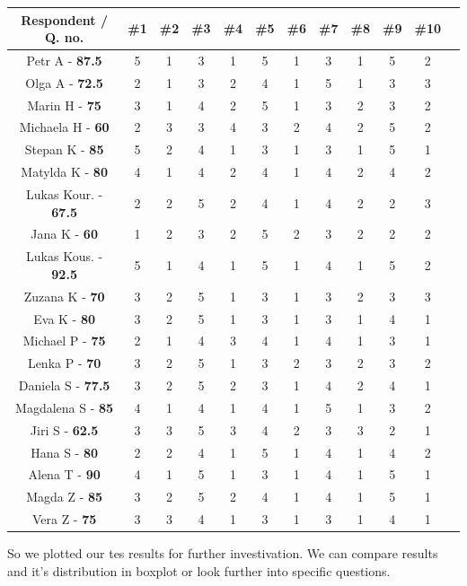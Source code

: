 \begin{tabular}{ |c|c|c|c|c|c|c|c|c|c|c|c| } 
    \hline
    Respondent / Q. no. & \#1 & \#2& \#3& \#4& \#5& \#6& \#7& \#8& \#9& \#10 \\
    \hline
    Petr A - \textbf{87.5}     & 5 & 1& 3& 1& 5& 1& 3& 1& 5& 2 \\ 
    Olga A - \textbf{72.5}     & 2 & 1& 3& 2& 4& 1& 5& 1& 3& 3 \\ 
    Marin H - \textbf{75}    & 3 & 1& 4& 2& 5& 1& 3& 2& 3& 2 \\ 
    Michaela H - \textbf{60} & 2 & 3& 3& 4& 3& 2& 4& 2& 5& 2 \\ 
    Stepan K - \textbf{85}   & 5 & 2& 4& 1& 3& 1& 3& 1& 5& 1 \\ 
    Matylda K - \textbf{80}  & 4 & 1& 4& 2& 4& 1& 4& 2& 4& 2 \\ 
    Lukas Kour. - \textbf{67.5} & 2 & 2& 5& 2& 4& 1& 4& 2& 2& 3 \\ 
    Jana K - \textbf{60}    & 1 & 2& 3& 2& 5& 2& 3& 2& 2& 2 \\ 
    Lukas Kous. - \textbf{92.5} & 5 & 1& 4& 1& 5& 1& 4& 1& 5& 2 \\ 
    Zuzana K - \textbf{70}   & 3 & 2& 5& 1& 3& 1& 3& 2& 3& 3 \\ 
    Eva K - \textbf{80}      & 3 & 2& 5& 1& 3& 1& 3& 1& 4& 1 \\ 
    Michael P - \textbf{75}  & 2 & 1& 4& 3& 4& 1& 4& 1& 3& 1 \\ 
    Lenka P - \textbf{70}    & 3 & 2& 5& 1& 3& 2& 3& 2& 3& 2 \\ 
    Daniela S - \textbf{77.5}  & 3 & 2& 5& 2& 3& 1& 4& 2& 4& 1 \\ 
    Magdalena S - \textbf{85} & 4 & 1& 4& 1& 4& 1& 5& 1& 3& 2 \\ 
    Jiri S - \textbf{62.5}     & 3 & 3& 5& 3& 4& 2& 3& 3& 2& 1 \\ 
    Hana S - \textbf{80}     & 2 & 2& 4& 1& 5& 1& 4& 1& 4& 2 \\ 
    Alena T - \textbf{90}    & 4 & 1& 5& 1& 3& 1& 4& 1& 5& 1 \\ 
    Magda Z - \textbf{85}    & 3 & 2& 5& 2& 4& 1& 4& 1& 5& 1 \\ 
    Vera Z - \textbf{75}     & 3 & 3& 4& 1& 3& 1& 3& 1& 4& 1 \\ 
    \hline
\end{tabular}
\newpage
So we plotted our tes results for further investivation. We can compare results and it's distribution in boxplot or look further into specific questions.
